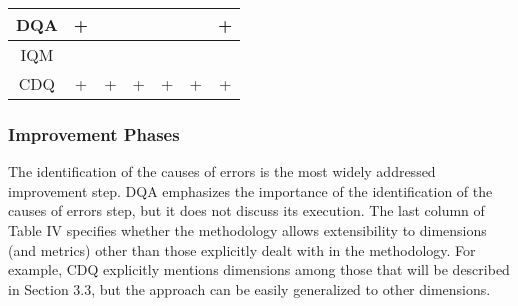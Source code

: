\documentclass[pdftex,english,oribibl]{llncs}
\begin{document}
\begin{table}[]
\begin{tabular}{|c|c|c|c|c|c|c|}
DQA                                                         & +                                                       &                                                                                      &                                                                                  &                                                            &                                                                                   & +                                                                                 \\ \hline
IQM                                                         &                                                         &                                                                                      &                                                                                  &                                                            &                                                                                   &                                                                                   \\ \hline
CDQ                                                         & +                                                       & +                                                                                    & +                                                                                & +                                                          & +                                                                                 & +                                                                                 \\ \hline
\end{tabular}
\end{table}

\subsubsection{Improvement Phases}
The identification of the causes of errors is the most widely addressed improvement step.
DQA emphasizes the importance of the identification of the causes of errors step, but it does not discuss its execution.
The last column of Table IV specifies whether the methodology allows extensibility to dimensions (and metrics) other than those explicitly dealt with in the methodology.
For example, CDQ explicitly mentions dimensions among those that will be described in Section 3.3, but the approach can be easily generalized to other dimensions.
\end{document}
